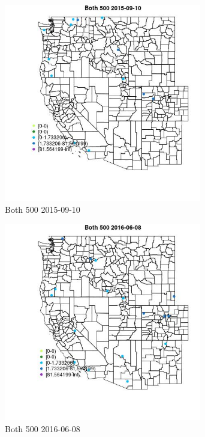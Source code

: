 \begin{figure} 
\centering  
\includegraphics[width=0.77\textwidth]{Code_Outputs/Report_ML_input_PM25_Step4_part_e_de_duplicated_aves_MapObsBoth_5002015-09-10.jpg} 
\caption{\label{fig:Report_ML_input_PM25_Step4_part_e_de_duplicated_avesMapObsBoth_5002015-09-10}Both 500 2015-09-10} 
\end{figure} 
 

\begin{figure} 
\centering  
\includegraphics[width=0.77\textwidth]{Code_Outputs/Report_ML_input_PM25_Step4_part_e_de_duplicated_aves_MapObsBoth_5002016-06-08.jpg} 
\caption{\label{fig:Report_ML_input_PM25_Step4_part_e_de_duplicated_avesMapObsBoth_5002016-06-08}Both 500 2016-06-08} 
\end{figure} 
 

